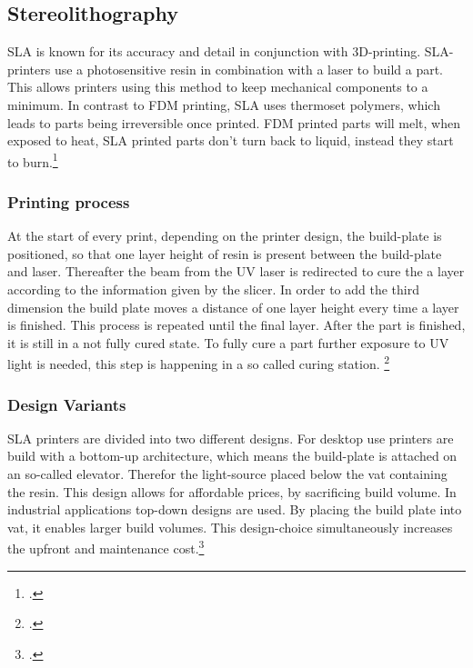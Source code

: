 \subsection{Stereolithography}

SLA is known for its accuracy and detail in conjunction with 3D-printing. SLA-printers use a photosensitive resin in combination with a laser to build a part. This allows printers using this method to keep mechanical components to a minimum. In contrast to FDM printing, SLA uses thermoset polymers, which leads to parts being irreversible once printed. FDM printed parts will melt, when exposed to heat, SLA printed parts don't turn back to liquid, instead they start to burn.\footcite{hubsSLA3DPrintingNoDate}

\subsubsection{Printing process}

At the start of every print, depending on the printer design, the build-plate is positioned, so that one layer height of resin is present between the build-plate and laser. Thereafter the beam from the UV laser is redirected to cure the a layer according to the information given by the slicer. In order to add the third dimension the build plate moves a distance of one layer height every time a layer is finished. This process is repeated until the final layer.\newline
After the part is finished, it is still in a not fully cured state. To fully cure a part further exposure to UV light is needed, this step is happening in a so called curing station. \footcite{hubsSLA3DPrintingNoDate} 

\subsubsection{Design Variants}

SLA printers are divided into two different designs. For desktop use printers are build with a bottom-up architecture, which means the build-plate is attached on an so-called elevator. Therefor the light-source placed below the vat containing the resin. This design allows for affordable prices, by sacrificing build volume.\newline
In industrial applications top-down designs are used. By placing the build plate into vat, it enables larger build volumes. This design-choice simultaneously increases the upfront and maintenance cost.\footcite{hubsSLA3DPrintingNoDate}